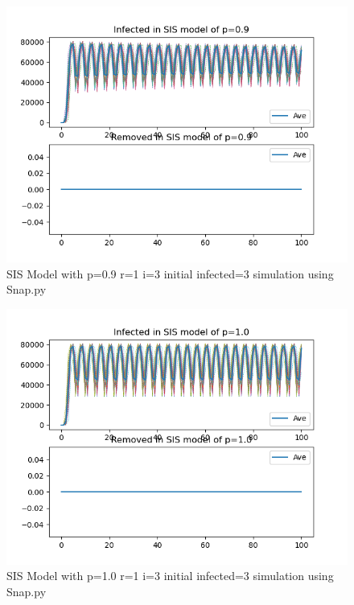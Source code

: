 \documentclass{subfile}
\begin{document}
  \begin{figure}
  \includegraphics[scale=0.8]{sisp09r1i3s3}
  \caption[SIS p=0.9,r=1,i=3,init infected=3]{SIS Model with p=0.9 r=1 i=3 initial infected=3 simulation using Snap.py}
  \end{figure}
  \begin{figure}
  \includegraphics[scale=0.8]{sisp10r1i3s3}
  \caption[SIS p=1.0,r=1,i=3,init infected=3]{SIS Model with p=1.0 r=1 i=3 initial infected=3 simulation using Snap.py}
  \end{figure}

  \clearpage
\end{document}
